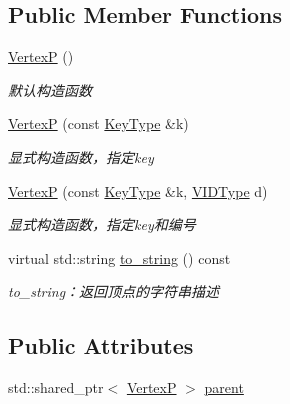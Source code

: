 \subsection*{Public Member Functions}
\begin{DoxyCompactItemize}
\item 
\hyperlink{struct_introduction_to_algorithm_1_1_graph_algorithm_1_1_vertex_p_a695048962ddb2a044ff450dc17b7001e}{Vertex\+P} ()
\begin{DoxyCompactList}\small\item\em 默认构造函数 \end{DoxyCompactList}\item 
\hyperlink{struct_introduction_to_algorithm_1_1_graph_algorithm_1_1_vertex_p_afc46e0e4db66ca6dbabd85ea872d7239}{Vertex\+P} (const \hyperlink{struct_introduction_to_algorithm_1_1_graph_algorithm_1_1_vertex_a14e958c58a404474853491eb811954cc}{Key\+Type} \&k)
\begin{DoxyCompactList}\small\item\em 显式构造函数，指定{\ttfamily key} \end{DoxyCompactList}\item 
\hyperlink{struct_introduction_to_algorithm_1_1_graph_algorithm_1_1_vertex_p_aa170e385f494f36442888addfadbc711}{Vertex\+P} (const \hyperlink{struct_introduction_to_algorithm_1_1_graph_algorithm_1_1_vertex_a14e958c58a404474853491eb811954cc}{Key\+Type} \&k, \hyperlink{struct_introduction_to_algorithm_1_1_graph_algorithm_1_1_vertex_a290c84c0dcf159f833c72c47a2d4d44a}{V\+I\+D\+Type} d)
\begin{DoxyCompactList}\small\item\em 显式构造函数，指定{\ttfamily key}和编号 \end{DoxyCompactList}\item 
virtual std\+::string \hyperlink{struct_introduction_to_algorithm_1_1_graph_algorithm_1_1_vertex_p_a86c8284b603498264ea040ddb0a7065f}{to\+\_\+string} () const 
\begin{DoxyCompactList}\small\item\em to\+\_\+string：返回顶点的字符串描述 \end{DoxyCompactList}\end{DoxyCompactItemize}
\subsection*{Public Attributes}
\begin{DoxyCompactItemize}
\item 
std\+::shared\+\_\+ptr$<$ \hyperlink{struct_introduction_to_algorithm_1_1_graph_algorithm_1_1_vertex_p}{Vertex\+P} $>$ \hyperlink{struct_introduction_to_algorithm_1_1_graph_algorithm_1_1_vertex_p_ad7af59de5b07b0f26de28e9085b710ea}{parent}
\end{DoxyCompactItemize}


